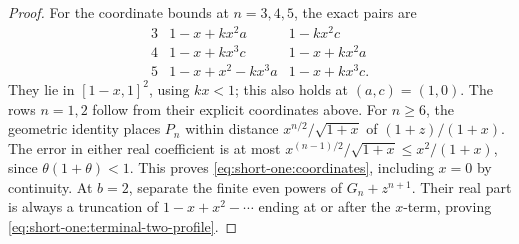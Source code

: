 \begin{proof}
For the coordinate bounds at \(n=3,4,5\), the exact pairs are
\[
\begin{array}{c|cc}
3&1-x+kx^2a&1-kx^2c\\
4&1-x+kx^3c&1-x+kx^2a\\
5&1-x+x^2-kx^3a&1-x+kx^3c .
\end{array}
\]
They lie in \([1-x,1]^2\), using \(kx<1\); this also holds at
\((a,c)=(1,0)\). The rows \(n=1,2\) follow from their explicit
coordinates above.
For \(n\ge6\), the geometric identity places \(P_n\) within distance
\(x^{n/2}/\sqrt{1+x}\) of \((1+z)/(1+x)\).
The error in either real coefficient is at most
\(x^{(n-1)/2}/\sqrt{1+x}\le x^2/(1+x)\), since
\(\theta(1+\theta)<1\). This proves
\eqref{eq:short-one:coordinates}, including \(x=0\) by continuity.
At \(b=2\), separate the finite even powers of \(G_n+z^{n+1}\).
Their real part is always a truncation of \(1-x+x^2-\cdots\)
ending at or after the \(x\)-term, proving
\eqref{eq:short-one:terminal-two-profile}.
\end{proof}

